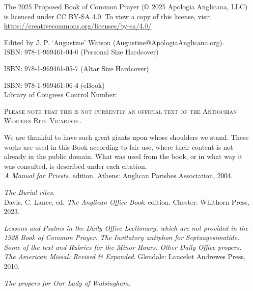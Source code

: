 \setcounter{page}{1}
\frontmatter
{}
{}
\noindent
The 2025 Proposed Book of Common Prayer ($\copyright$ 2025 Apologia Anglicana, LLC) is licenced under CC BY-SA 4.0. To view a copy of this license, visit \url{https://creativecommons.org/licenses/by-sa/4.0/}\\
\par\noindent
Edited by J. P. `Augustine' Watson (Augustine@ApologiaAnglicana.org).\\

ISBN: 978-1-969461-04-0 (Personal Size Hardcover)

ISBN: 978-1-969461-05-7 (Altar Size Hardcover)

ISBN: 978-1-969461-06-4 (eBook)\\

Library of Congress Control Number: 

\begin{center}
	\textsc{Please note that this is not currently an official text of the Antiochian Western Rite Vicariate.}
\end{center}

\par\noindent
We are thankful to have such great giants upon whose shoulders we stand. These works are used in this Book according to fair use, where their content is not already in the public domain. What was used from the book, or in what way it was consulted, is described under each citation.\\

\textit{A Manual for Priests}.  edition. Athens: Anglican Parishes Association, 2004.\par\noindent
\textit{The Burial rites.}\\

Davis, C. Lance, ed. \textit{The Anglican Office Book}.  edition. Chester: Whithorn Press, 2023.\par\noindent
\textit{Lessons and Psalms in the Daily Office Lectionary, which are not provided in the 1928 Book of Common Prayer. The Invitatory antiphon for Septuagesimatide. Some of the text and Rubrics for the Minor Hours. Other Daily Office propers.}\\

\textit{The American Missal: Revised \& Expanded}. Glendale: Lancelot Andrewes Press, 2010.\par\noindent
\textit{The propers for Our Lady of Walsingham.}\\

